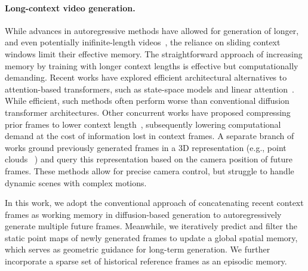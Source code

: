 \paragraph{Long-context video generation.}
While advances in autoregressive methods have allowed for generation of longer, and even potentially inifinite-length videos~\cite{Chen2025SkyReelsV2IF}, the reliance on sliding context windows limit their effective memory. The straightforward approach of increasing memory by training with longer context lengths is effective but computationally demanding. Recent works have explored efficient architectural alternatives to attention-based transformers, such as state-space models and linear attention~\cite{Wang2024LinGenTH,Liu2024LinFusion1G}. While efficient, such methods often perform worse than conventional diffusion transformer architectures. Other concurrent works have proposed compressing prior frames to lower context length~\cite{Zhang2025PackingIF,Gu2025LongContextAV}, subsequently lowering computational demand at the cost of information lost in context frames. A separate branch of works ground previously generated frames in a 3D representation (e.g., point clouds ~\cite{yu2024viewcrafter,gu2025das,yu2025trajectorycrafter,ren2025gen3c}) and query this representation based on the camera position of future frames. These methods allow for precise camera control, but struggle to handle dynamic scenes with complex motions.

In this work, we adopt the conventional approach of concatenating recent context frames as working memory in diffusion-based generation to autoregressively generate multiple future frames. Meanwhile, we iteratively predict and filter the static point maps of newly generated frames to update a global spatial memory, which serves as geometric guidance for long-term generation. We further incorporate a sparse set of historical reference frames as an episodic memory.




\endinput


